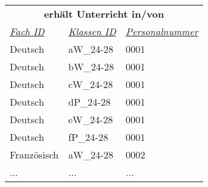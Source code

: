 \documentclass{standalone}
\begin{document}
\begin{tabular}{|l|l|l|}
    \hline
    \multicolumn{3}{c}{\cellcolor[HTML]{C0C0C0} \textbf{erhält Unterricht in/von}} \\
    \textit{\underline{Fach ID}}&
    \textit{\underline{Klassen ID}}&
    \textit{\underline{Personalnummer}} \\ \hline
    Deutsch&aW\_24-28&0001\\
    Deutsch&bW\_24-28&0001\\
    Deutsch&cW\_24-28&0001\\
    Deutsch&dP\_24-28&0001\\
    Deutsch&eW\_24-28&0001\\
    Deutsch&fP\_24-28&0001\\
    Französisch&aW\_24-28&0002\\
    ...&...&...\\
    \hline
    \end{tabular}
\end{document}

